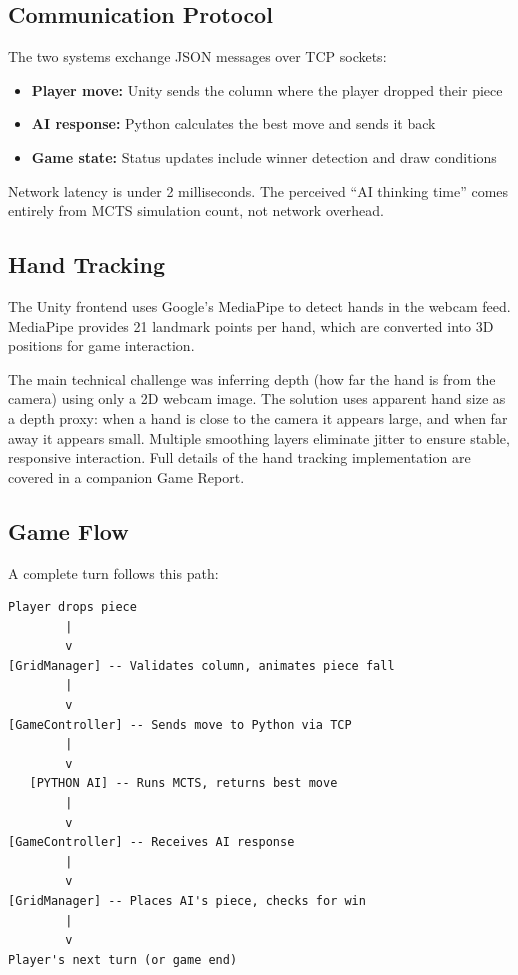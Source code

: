 \documentclass[11pt]{article}
\begin{document}
\subsection{Communication Protocol}

The two systems exchange JSON messages over TCP sockets:

\begin{itemize}
    \item \textbf{Player move:} Unity sends the column where the player dropped their piece
    \item \textbf{AI response:} Python calculates the best move and sends it back
    \item \textbf{Game state:} Status updates include winner detection and draw conditions
\end{itemize}

Network latency is under 2 milliseconds. The perceived ``AI thinking time'' comes entirely from MCTS simulation count, not network overhead.

\subsection{Hand Tracking}

The Unity frontend uses Google's MediaPipe to detect hands in the webcam feed. MediaPipe provides 21 landmark points per hand, which are converted into 3D positions for game interaction.

The main technical challenge was inferring depth (how far the hand is from the camera) using only a 2D webcam image. The solution uses apparent hand size as a depth proxy: when a hand is close to the camera it appears large, and when far away it appears small. Multiple smoothing layers eliminate jitter to ensure stable, responsive interaction. Full details of the hand tracking implementation are covered in a companion Game Report.

\subsection{Game Flow}

A complete turn follows this path:

\noindent\begin{minipage}{\linewidth}
\begin{verbatim}
Player drops piece
        |
        v
[GridManager] -- Validates column, animates piece fall
        |
        v
[GameController] -- Sends move to Python via TCP
        |
        v
   [PYTHON AI] -- Runs MCTS, returns best move
        |
        v
[GameController] -- Receives AI response
        |
        v
[GridManager] -- Places AI's piece, checks for win
        |
        v
Player's next turn (or game end)
\end{verbatim}
\end{minipage}
\end{document}
